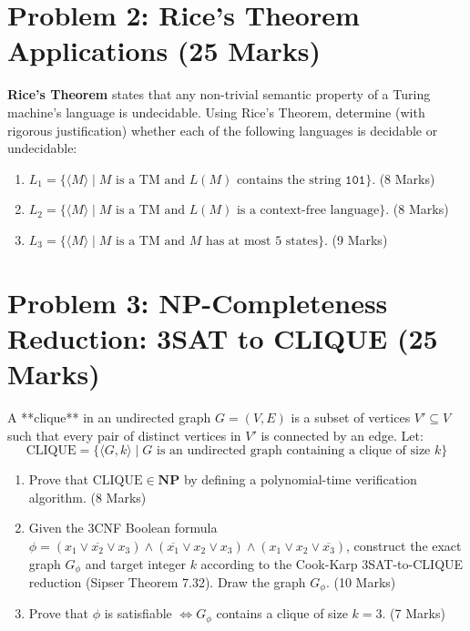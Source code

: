 \documentclass[11pt,a4paper]{article}
\begin{document}
\vspace{8pt}

\section*{Problem 2: Rice's Theorem Applications (25 Marks)}
\textbf{Rice's Theorem} states that any non-trivial semantic property of a Turing machine's language is undecidable.
Using Rice's Theorem, determine (with rigorous justification) whether each of the following languages is decidable or undecidable:
\begin{enumerate}[label=\textbf{(\alph*)}]
    \item $L_1 = \{\langle M \rangle \mid M \text{ is a TM and } L(M) \text{ contains the string } \texttt{101}\}$. (8 Marks)
    \item $L_2 = \{\langle M \rangle \mid M \text{ is a TM and } L(M) \text{ is a context-free language}\}$. (8 Marks)
    \item $L_3 = \{\langle M \rangle \mid M \text{ is a TM and } M \text{ has at most 5 states}\}$. (9 Marks)
\end{enumerate}

\vspace{8pt}

\section*{Problem 3: NP-Completeness Reduction: 3SAT to CLIQUE (25 Marks)}
A **clique** in an undirected graph $G = (V, E)$ is a subset of vertices $V' \subseteq V$ such that every pair of distinct vertices in $V'$ is connected by an edge. Let:
$$\text{CLIQUE} = \{\langle G, k \rangle \mid G \text{ is an undirected graph containing a clique of size } k\}$$
\begin{enumerate}[label=\textbf{(\alph*)}]
    \item Prove that $\text{CLIQUE} \in \mathbf{NP}$ by defining a polynomial-time verification algorithm. (8 Marks)
    \item Given the 3CNF Boolean formula $\phi = (x_1 \lor \overline{x_2} \lor x_3) \land (\overline{x_1} \lor x_2 \lor x_3) \land (x_1 \lor x_2 \lor \overline{x_3})$, construct the exact graph $G_\phi$ and target integer $k$ according to the Cook-Karp 3SAT-to-CLIQUE reduction (Sipser Theorem 7.32). Draw the graph $G_\phi$. (10 Marks)
    \item Prove that $\phi$ is satisfiable $\iff G_\phi$ contains a clique of size $k=3$. (7 Marks)
\end{enumerate}
\end{document}
